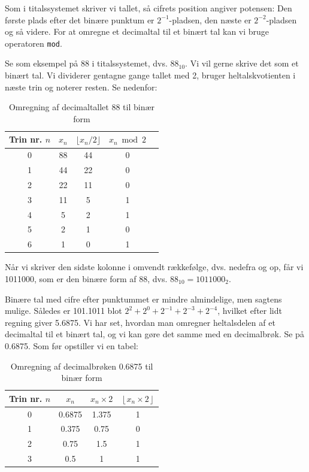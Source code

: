 Som i titalssystemet skriver vi tallet, så cifrets position angiver potensen: Den første plads efter det binære punktum er $2^{-1}$-pladsen, den næste er $2^{-2}$-pladsen og så videre. For at omregne et decimaltal til et binært tal kan vi bruge operatoren \texttt{mod}.

Se som eksempel på 88 i titalssystemet, dvs. $88_{10}$. Vi vil gerne skrive det som et binært tal. Vi dividerer gentagne gange tallet med 2, bruger heltalskvotienten i næste trin og noterer resten. Se nedenfor:

\begin{table}[h!]
\centering
\renewcommand{\arraystretch}{1.4}
\begin{tabular}{|c|c|c|c|c|}
\hline 
Trin nr. $n$ & $x_n$ & $\lfloor x_n / 2 \rfloor$ & $x_n \bmod 2$ \\ \hline
0 & 88 & 44 & 0 \\ 
1 & 44 & 22 & 0 \\
2 & 22 & 11 & 0 \\
3 & 11 & 5 & 1 \\
4 & 5 & 2 & 1 \\
5 & 2 & 1 & 0 \\
6 & 1 & 0 & 1 \\ \hline
\end{tabular}
\caption{Omregning af decimaltallet 88 til binær form}
\end{table}

Når vi skriver den sidste kolonne i omvendt rækkefølge, dvs. nedefra og op, får vi 1011000, som er den binære form af 88, dvs. $88_{10} = 1011000_2$.

Binære tal med cifre efter punktummet er mindre almindelige, men sagtens mulige. Således er 101.1011 blot $2^2 + 2^0 + 2^{-1} + 2^{-3} + 2^{-4}$, hvilket efter lidt regning giver 5.6875. Vi har set, hvordan man omregner heltalsdelen af et decimaltal til et binært tal, og vi kan gøre det samme med en decimalbrøk. Se på 0.6875. Som før opstiller vi en tabel:

\begin{table}[h!]
\centering
\renewcommand{\arraystretch}{1.4}
\begin{tabular}{|c|c|c|c|}
\hline 
Trin nr. $n$ & $x_n$ & $x_n \times 2$ & $\left\lfloor x_n \times 2 \right\rfloor$ \\ \hline
0 & 0.6875 & 1.375 & 1 \\ \hline
1 & 0.375 & 0.75 & 0 \\ \hline
2 & 0.75 & 1.5 & 1 \\ \hline
3 & 0.5 & 1 & 1 \\ \hline
\end{tabular}
\caption{Omregning af decimalbrøken 0.6875 til binær form}
\end{table}

